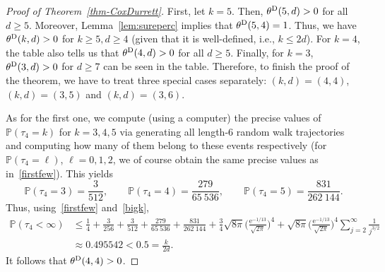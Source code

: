 \documentclass[oneside]{amsart}
\newcommand{\e}{\mathrm e}
\theoremstyle{definition}
\renewcommand{\P}{\mathbb{P}}
\newcommand{\1}{\mathbbm{1}}
\newcommand{\0}{\mathbf{o}}
\newcommand{\basc}[1]{{\color{blue}{ \bf [~Bas:\ }\emph{#1}\textbf{~]}}}
\numberwithin{equation}{section}
\begin{document}
\begin{proof}[Proof of Theorem~\ref{thm-CoxDurrett}]
First, let $k=5$. Then,  $\theta^{\rm D}(5,d) >0$ for all $d \geq 5$. Moreover, Lemma~\ref{lem:sureperc} implies that $\theta^{\rm D}(5,4)=1$. Thus, we have $\theta^{\rm D}(k,d) >0$ for $k\geq 5, d\geq 4$ (given that it is well-defined, i.e., $k\leq 2d$). For $k=4$, the table also tells us that  $\theta^{\rm D}(4,d)>0$ for all $d \geq 5$. Finally, for $k=3$, $\theta^{\rm D}(3,d)>0$ for $d \geq 7$ can be seen in the table. Therefore, to finish the proof of the theorem, we have to treat three special cases separately: $(k,d)=(4,4)$, $(k,d)=(3,5)$ and $(k,d)=(3,6)$. 

As for the first one, we compute (using a computer) the precise values of $\P(\tau_4=k)$ for $k=3,4,5$ via generating all length-6 random walk trajectories and computing how many of them belong to these events respectively (for $\P(\tau_4=\ell)$, $\ell=0,1,2$, we of course obtain the same precise values as in~\eqref{firstfew}). This yields
\[ \P(\tau_4=3)=\frac{3}{512}, \qquad \P(\tau_4=4)=\frac{279}{65\ 536}, \qquad \P(\tau_4=5)=\frac{831}{262\ 144}. \]
Thus, using~\eqref{firstfew} and~\eqref{bigk},
\[ { \begin{aligned} \P(\tau_4<\infty) & \leq \frac{1}{4} + \frac{3}{256} + \frac{3}{512} + \frac{279}{65\ 536} + \frac{831}{262\ 144} + \frac{3}{4} \sqrt{8\pi} \Big( \frac{\e^{-1/13}}{\sqrt{2\pi}} \Big)^4 + \sqrt{8\pi} \Big( \frac{\e^{-1/13}}{\sqrt{2\pi}} \Big)^4 \sum_{j=2}^{\infty} \frac{1}{j^{3/2}} \\ & \approx 0.495542 < 0.5 = \frac{k}{2d}. \end{aligned} }\]
It follows that $\theta^{\rm D}(4,4)>0$.%


\end{proof}
\end{document}
